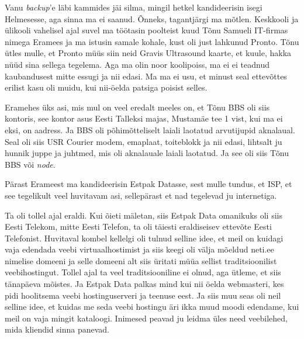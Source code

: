 Vanu \emph{backup}'e läbi kammides jäi silma, mingil hetkel kandideerisin isegi Helmesesse, aga sinna ma ei saanud. Õnneks, tagantjärgi ma mõtlen. Keskkooli ja ülikooli vahelisel ajal suvel ma töötasin poolteist kuud Tõnu Samueli IT-firmas nimega Eramees ja ma istusin samale kohale, kust oli just lahkunud Pronto.   Tõnu ütles mulle, et Pronto müüs siin  neid Gravis Ultrasound kaarte, et kuule, hakka nüüd sina sellega tegelema. Aga ma olin noor koolipoiss, ma ei  ei teadnud kaubandusest mitte essugi ja nii edasi. Ma ma ei usu, et minust seal ettevõttes erilist  kasu oli muidu, kui nii-öelda patsiga poisist selles. 


Eramehes üks asi, mis mul on veel eredalt meeles on, et Tõnu BBS oli siis kontoris, see kontor asus Eesti Talleksi majas, Mustamäe tee 1 vist, kui ma ei eksi, on aadress. Ja BBS oli põhimõtteliselt  laiali laotatud arvutijupid  aknalaual. Seal oli siis USR Courier modem,  emaplaat, toiteblokk  ja nii edasi, lihtsalt ju hunnik juppe ja juhtmed, mis oli aknalauale laiali laotatud. Ja see oli siis Tõnu BBS või \emph{node}.

Pärast Erameest ma kandideerisin Estpak Datasse, sest mulle tundus, et ISP, et see tegelikult veel huvitavam asi, sellepärast et nad tegelevad ju internetiga.


Ta oli tollel ajal eraldi. Kui õieti mäletan, siis Estpak Data omanikuks oli siis Eesti Telekom, mitte  Eesti Telefon, ta oli täiesti eraldiseisev ettevõte Eesti Telefonist. Huvitaval kombel kellelgi oli tulnud selline idee, et meil on kuidagi vaja edendada veebi  virtuaalhostimist ja siis keegi oli välja mõeldud neti.ee nimelise domeeni ja selle domeeni alt siis üritati müüa sellist traditsioonilist veebihostingut. Tollel ajal ta veel traditsiooniline ei olnud, aga ütleme, et siis tänapäeva mõistes. Ja  Estpak Data palkas mind kui nii öelda webmasteri, kes pidi hoolitsema veebi hostinguserveri ja teenuse eest. Ja siis muu seas  oli neil selline idee, et kuidas me seda veebi hostingu äri ikka muud moodi edendame, kui meil on vaja mingit kataloogi. Inimesed peavad ju leidma üles need veebilehed, mida  kliendid sinna panevad.

